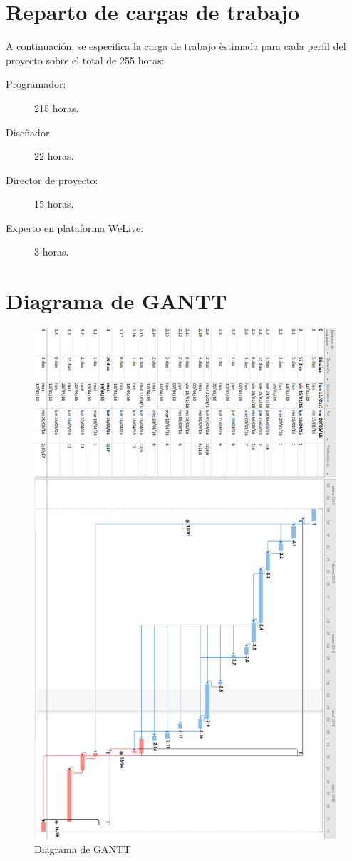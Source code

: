 \documentclass{DeustoFDP}
\begin{document}
\section{Reparto de cargas de trabajo}
A continuación, se especifica la carga de trabajo èstimada para cada perfil del proyecto sobre el total de 255 horas:
\begin{description}
    \item[Programador:] 215 horas.
    \item[Diseñador:] 22 horas.
    \item[Director de proyecto:] 15 horas.
    \item[Experto en plataforma WeLive:] 3 horas.
\end{description}
\newpage
\section{Diagrama de GANTT}
\begin{figure}[H]
    \centering
    \includegraphics[width=340pt]{fig/gantt}
    \caption{Diagrama de GANTT}\label{fig:gantt}
\end{figure}
\newpage
\end{document}
